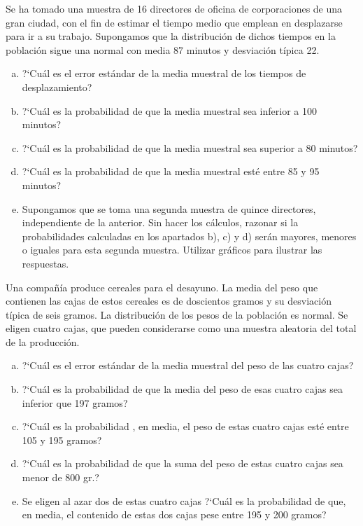 \documentclass[12pt]{article}
\begin{document}
    \begin{prob}
        Se ha tomado una muestra de 16 directores de oficina  de
        corporaciones de una gran ciudad, con el fin de estimar el tiempo
        medio que emplean en desplazarse para ir a su trabajo. Supongamos
        que la distribución de dichos tiempos en la población sigue una
        normal con media 87 minutos y desviación típica  22.
        \begin{enumerate}[a)]
\item ?`Cuál es el error estándar de la media muestral de los
tiempos de desplazamiento?
\item ?`Cuál es la probabilidad de que la media muestral sea
inferior a 100 minutos?
\item ?`Cuál es la probabilidad de que la media muestral sea
superior  a 80 minutos?
\item ?`Cuál es la probabilidad de que la media muestral esté entre
85 y 95 minutos?
\item Supongamos que se toma una segunda muestra de quince directores,
independiente de la anterior. Sin hacer los cálculos, razonar si la probabilidades
calculadas en los apartados b), c) y d)  serán mayores, menores o iguales para esta segunda
muestra. Utilizar gráficos para ilustrar las respuestas.
        \end{enumerate}
    \end{prob}

\begin{prob}
    Una compañía produce cereales para el desayuno. La media del
    peso que contienen las cajas de estos cereales es de doscientos
    gramos y su desviación típica de seis gramos. La distribución de
    los pesos de la población es normal. Se eligen cuatro cajas, que
    pueden considerarse como una muestra aleatoria del total de la
    producción.
    \begin{enumerate}[a)]
        \item ?`Cuál es el error estándar de la media muestral del peso de
        las cuatro cajas?
        \item ?`Cuál es la probabilidad de que la media del peso de esas cuatro cajas
        sea inferior  que 197 gramos?
        \item ?`Cuál es la probabilidad , en media, el peso de estas
        cuatro cajas esté entre 105 y 195 gramos?
        \item ?`Cuál es la probabilidad de que la suma del peso de estas
        cuatro cajas sea menor de 800 gr.?
        \item Se eligen al azar dos de estas cuatro cajas ?`Cuál es la
        probabilidad de que, en media, el contenido de estas dos cajas
        pese entre 195 y 200 gramos?
        \end{enumerate}
    \end{prob}
\end{document}
